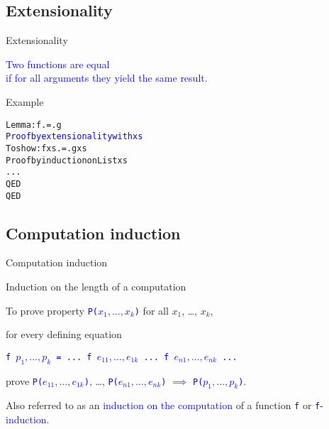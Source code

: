 \documentclass{beamer}
\def\code#1{\texttt{\frenchspacing#1}}
\begin{document}
\subsection{Extensionality}

\begin{frame}[fragile]{Extensionality}

\begin{center}
    \textcolor{blue}{Two functions are equal \\ if for all arguments they yield the same result}.
\end{center}

\pause

\vspace{0.5cm}
\begin{exampleblock}{Example}
\begin{alltt}
Lemma: f .=. g
\textcolor{blue}{Proof by extensionality with xs}
  To show: f xs .=. g xs
  Proof by induction on List xs
    ...
  QED
QED
\end{alltt}
\end{exampleblock}

\end{frame}

\subsection{Computation induction}

\begin{frame}{Computation induction}

\begin{block}{\centering Induction on the length of a computation}
\end{block}

\pause

To prove property \textcolor{blue}{\code{P($x_1, \dots, x_k$)}} for all $x_1$, \dots, $x_k$, \par
for every defining equation

\begin{center}
\textcolor{blue}{\code{f $p_1, \dots, p_k$ = ... f $e_{11}, \dots, e_{1k}$ ... f $e_{n1}, \dots, e_{nk}$ ...}}
\end{center}

prove \textcolor{blue}{\code{P($e_{11}, \dots, e_{1k}$)}, \dots, \code{P($e_{n1}, \dots, e_{nk}$)} $\implies$ \code{P($p_1, \dots, p_k$)}}.

\pause

\vspace{0.5cm}
Also referred to as an \textcolor{blue}{induction on the computation} of a function \code{f} or \textcolor{blue}{\code{f}-induction}.

\end{frame}
\end{document}
